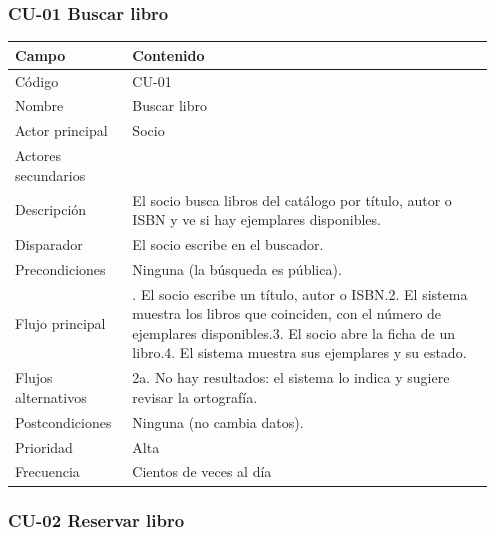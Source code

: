 \subsubsection*{CU-01 Buscar libro}

{\small
\begin{longtable}{@{}>{\raggedright\arraybackslash}p{0.233\linewidth}>{\raggedright\arraybackslash}p{0.716\linewidth}@{}}
\toprule
\textbf{Campo} & \textbf{Contenido} \\
\midrule
\endhead
Código & CU-01 \\
Nombre & Buscar libro \\
Actor principal & Socio \\
Actores secundarios &  \\
Descripción & El socio busca libros del catálogo por título, autor o ISBN y ve si hay ejemplares disponibles. \\
Disparador & El socio escribe en el buscador. \\
Precondiciones & Ninguna (la búsqueda es pública). \\
Flujo principal & 1. El socio escribe un título, autor o ISBN.\newline{}2. El sistema muestra los libros que coinciden, con el número de ejemplares disponibles.\newline{}3. El socio abre la ficha de un libro.\newline{}4. El sistema muestra sus ejemplares y su estado. \\
Flujos alternativos & 2a. No hay resultados: el sistema lo indica y sugiere revisar la ortografía. \\
Postcondiciones & Ninguna (no cambia datos). \\
Prioridad & Alta \\
Frecuencia & Cientos de veces al día \\
\bottomrule
\end{longtable}}

\subsubsection*{CU-02 Reservar libro}

